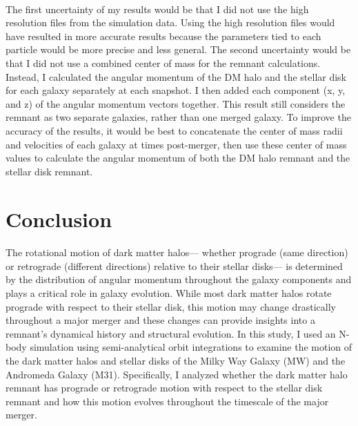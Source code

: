 \documentclass[fleqn,usenatbib]{mnras}
\begin{document}
\paragraph{} The first uncertainty of my results would be that I did not use the high resolution files from the simulation data. Using the high resolution files would have resulted in more accurate results because the parameters tied to each particle would be more precise and less general. The second uncertainty would be that I did not use a combined center of mass for the remnant calculations. Instead, I calculated the angular momentum of the DM halo and the stellar disk for each galaxy separately at each snapshot. I then added each component (x, y, and z) of the angular momentum vectors together. This result still considers the remnant as two separate galaxies, rather than one merged galaxy. To improve the accuracy of the results, it would be best to concatenate the center of mass radii and velocities of each galaxy at times post-merger, then use these center of mass values to calculate the angular momentum of both the DM halo remnant and the stellar disk remnant. 


\section{Conclusion}

\paragraph{} The rotational motion of dark matter halos--- whether prograde (same direction) or retrograde (different directions) relative to their stellar disks--- is determined by the distribution of angular momentum throughout the galaxy components and plays a critical role in galaxy evolution. While most dark matter halos rotate prograde with respect to their stellar disk, this motion may change drastically throughout a major merger and these changes can provide insights into a remnant's dynamical history and structural evolution. In this study, I used an N-body simulation using semi-analytical orbit integrations to examine the motion of the dark matter halos and stellar disks of the Milky Way Galaxy (MW) and the Andromeda Galaxy (M31). 
Specifically, I analyzed whether the dark matter halo remnant has prograde or retrograde motion with respect to the stellar disk remnant and how this motion evolves throughout the timescale of the major merger.
\end{document}
